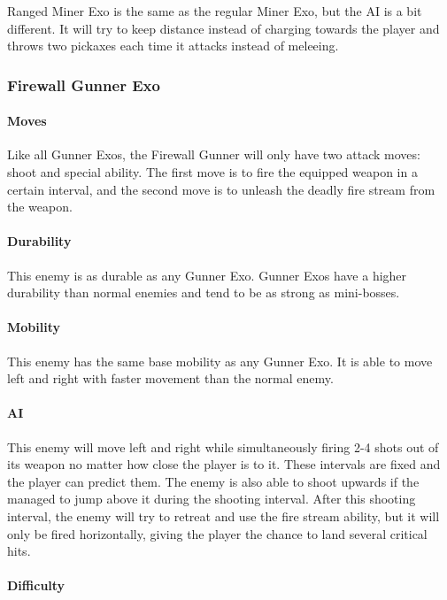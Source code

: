 \documentclass[12pt]{article}
\begin{document}
Ranged Miner Exo is the same as the regular Miner Exo, but the AI is a bit different. It will try to keep distance instead of charging towards the player and throws two pickaxes each time it attacks instead of meleeing. 

\subsubsection{Firewall Gunner Exo}

\paragraph{Moves}

Like all Gunner Exos, the Firewall Gunner will only have two attack moves: shoot and special ability. The first move is to fire the equipped weapon in a certain interval, and the second move is to unleash the deadly fire stream from the weapon.

\paragraph{Durability}

This enemy is as durable as any Gunner Exo. Gunner Exos have a higher durability than normal enemies and tend to be as strong as mini-bosses. 

\paragraph{Mobility}

This enemy has the same base mobility as any Gunner Exo. It is able to move left and right with faster movement than the normal enemy.

\paragraph{AI}

This enemy will move left and right while simultaneously firing 2-4 shots out of its weapon no matter how close the player is to it. These intervals are fixed and the player can predict them. The enemy is also able to shoot upwards if the managed to jump above it during the shooting interval. After this shooting interval, the enemy will try to retreat and use the fire stream ability, but it will only be fired horizontally, giving the player the chance to land several critical hits. 

\paragraph{Difficulty}
\end{document}
